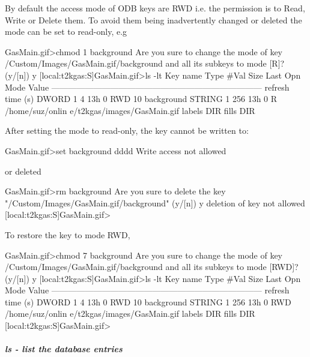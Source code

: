 By default the access mode of ODB keys are RWD i.e. the permission is to Read, Write or Delete them. To avoid them being inadvertently changed or deleted the mode can be set to read-\/only, e.g 
\begin{DoxyCode}
GasMain.gif>chmod 1 background
Are you sure to change the mode of key
  /Custom/Images/GasMain.gif/background
and all its subkeys
to mode [R]? (y/[n]) y
[local:t2kgas:S]GasMain.gif>ls -lt
Key name                        Type    #Val  Size  Last Opn Mode Value
---------------------------------------------------------------------------
refresh time (s)                DWORD   1     4     13h  0   RWD  10
background                      STRING  1     256   13h  0   R    /home/suz/onlin
      e/t2kgas/images/GasMain.gif
labels                          DIR
fills                           DIR
\end{DoxyCode}
 After setting the mode to read-\/only, the key cannot be written to: 
\begin{DoxyCode}
GasMain.gif>set background dddd
Write access not allowed
\end{DoxyCode}
 or deleted 
\begin{DoxyCode}
GasMain.gif>rm background
Are you sure to delete the key
"/Custom/Images/GasMain.gif/background"
(y/[n]) y
deletion of key not allowed
[local:t2kgas:S]GasMain.gif> 
\end{DoxyCode}


To restore the key to mode RWD, 
\begin{DoxyCode}
GasMain.gif>chmod 7 background
Are you sure to change the mode of key
  /Custom/Images/GasMain.gif/background
and all its subkeys
to mode [RWD]? (y/[n]) y
[local:t2kgas:S]GasMain.gif>ls -lt
Key name                        Type    #Val  Size  Last Opn Mode Value
---------------------------------------------------------------------------
refresh time (s)                DWORD   1     4     13h  0   RWD  10
background                      STRING  1     256   13h  0   RWD  /home/suz/onlin
      e/t2kgas/images/GasMain.gif
labels                          DIR
fills                           DIR
[local:t2kgas:S]GasMain.gif>
\end{DoxyCode}




\hypertarget{RC_odbedit_examples_RC_odbedit_ls}{}\subparagraph{ls -\/ list the database entries}\label{RC_odbedit_examples_RC_odbedit_ls}


